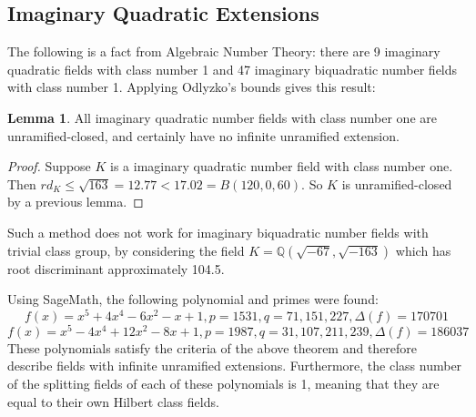 \documentclass[12pt]{extarticle}
\newcommand{\<}{\langle}
\renewcommand{\>}{\rangle}
\theoremstyle{definition}
\newtheorem{lemma}{Lemma}
\begin{document}
\subsection{Imaginary Quadratic Extensions}

The following is a fact from Algebraic Number Theory: there are 9 imaginary quadratic fields with class number 1 and 47 imaginary biquadratic number fields with class number 1. Applying Odlyzko's bounds gives this result:
\begin{lemma}
All imaginary quadratic number fields with class number one are unramified-closed, and certainly have no infinite unramified extension.  
\end{lemma}
\begin{proof}
Suppose $K$ is a imaginary quadratic number field with class number one. Then $rd_K \leq \sqrt{163} = 12.77 < 17.02 = B(120,0,60)$. So $K$ is unramified-closed by a previous lemma. 
\end{proof}
Such a method does not work for imaginary biquadratic number fields with trivial class group, by considering the field $K=\mathbb{Q}(\sqrt{-67},\sqrt{-163})$ which has root discriminant approximately 104.5.

Using SageMath, the following polynomial and primes were found:
\begin{equation}
    f(x)=x^5+4x^4-6x^2-x+1, p=1531,q=71,151,227,\Delta(f)=170701
\end{equation}
\begin{equation}
 f(x)=x^5-4x^4+12x^2-8x+1,p=1987,q=31,107,211,239,\Delta(f)=186037
 \end{equation}
These polynomials satisfy the criteria of the above theorem and therefore describe fields with infinite unramified extensions. Furthermore, the class number of the splitting fields of each of these polynomials is 1, meaning that they are equal to their own Hilbert class fields. \par
\end{document}
